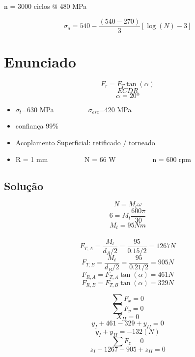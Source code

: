 
n = 3000 ciclos @ 480 MPa

\[\sigma _{a}=540-\frac{(540-270)}{3}\left[ \log(N)-3 \right]\]

\newpage

\section{Enunciado}



\[F_{r}=F_{T}\tan(\alpha)\]
\[ECDR\]
\[\alpha = 20º\]
\begin{itemize}
\item $\sigma _{t}$=630 MPa\ \ \ \ \ \ \ \ \ \ $\sigma _{esc}$=420 MPa
\item confiança 99\%
\item Acoplamento Superficial: retificado / torneado
\item R = 1 mm \ \ \ \ \ \ \ \ \ \ N = 66 W \ \ \ \ \ \ \ \ \ \ n = 600 rpm
\end{itemize}

\subsection*{Solução}
\[N = M_{t}\omega\]
\[6 = M_{t}\frac{600 \pi}{30}\]
\[M_{t}=95 Nm\]
\\
\[F_{T,A}=\frac{M_{t}}{d_{A}/2}=\frac{95}{0.15/2}=1267 N\]
\[F_{T,B}=\frac{M_{t}}{d_{B}/2}=\frac{95}{0.21/2}=905 N\]
\[F_{R,A}=F_{T,A}\tan(\alpha)=461 N\]
\[F_{R,B}=F_{T,B}\tan(\alpha)=329 N\]






\[\sum F_{x} = 0\]
\[\sum F_{y} = 0\]
\[X_{II}=0\]
\[y_{I}+461-329+y_{II}=0\]
\[y_{I}+y_{II}=-132 (N)\]
\[\sum F_{z} = 0\]
\[z_{I}-1267-905+z_{II}=0\]

